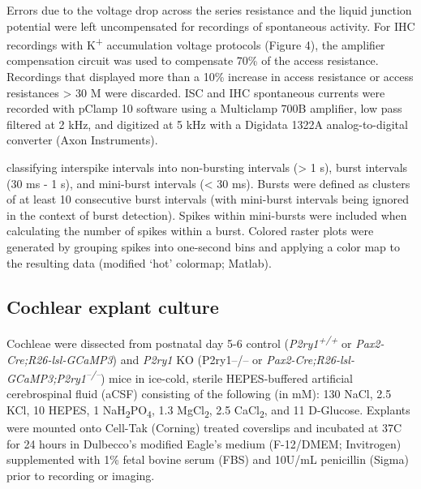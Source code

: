 \documentclass[9pt,lineno]{elife}
\begin{document}
Errors due to the voltage drop across the series resistance and the liquid junction potential were left uncompensated for recordings of spontaneous activity. For IHC recordings with K\textsuperscript{+} accumulation voltage protocols (Figure 4), the amplifier compensation circuit was used to compensate 70\% of the access resistance. Recordings that displayed more than a 10\% increase in access resistance or access resistances > 30 M\textohm \hspace{0.5mm} were discarded. ISC and IHC spontaneous currents were recorded with pClamp 10 software using a Multiclamp 700B amplifier, low pass filtered at 2 kHz, and digitized at 5 kHz with a Digidata 1322A analog-to-digital converter (Axon Instruments).

classifying interspike intervals into non-bursting intervals (> 1 s), burst intervals (30 ms - 1 s), and mini-burst intervals (< 30 ms). Bursts were defined as clusters of at least 10 consecutive burst intervals (with mini-burst intervals being ignored in the context of burst detection). Spikes within mini-bursts were included when calculating the number of spikes within a burst. Colored raster plots were generated by grouping spikes into one-second bins and applying a color map to the resulting data (modified `hot’ colormap; Matlab).

\subsection{Cochlear explant culture}
Cochleae were dissected from postnatal day 5-6 control (\textit{P2ry1\textsuperscript{+/+}} or \textit{Pax2-Cre;R26-lsl-GCaMP3}) and \textit{P2ry1} KO (P2ry1–/– or \textit{Pax2-Cre;R26-lsl-GCaMP3;P2ry1\textsuperscript{–/–}}) mice in ice-cold, sterile HEPES-buffered artificial cerebrospinal fluid (aCSF) consisting of the following (in mM): 130 NaCl, 2.5 KCl, 10 HEPES, 1 NaH\textsubscript{2}PO\textsubscript{4}, 1.3 MgCl\textsubscript{2}, 2.5 CaCl\textsubscript{2}, and 11 D-Glucose. Explants were mounted onto Cell-Tak (Corning) treated coverslips and incubated at 37\textdegree C for 24 hours in Dulbecco’s modified Eagle’s medium (F-12/DMEM; Invitrogen) supplemented with 1\% fetal bovine serum (FBS) and 10U/mL penicillin (Sigma) prior to recording or imaging. 
\end{document}
